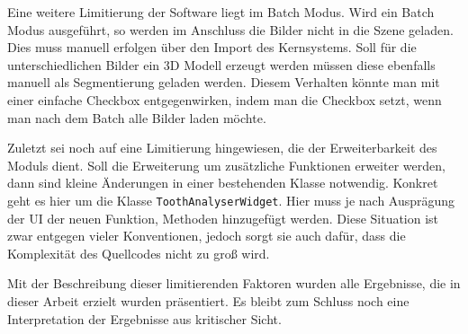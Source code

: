 Eine weitere Limitierung der Software liegt im Batch Modus. Wird ein Batch Modus
ausgeführt, so werden im Anschluss die Bilder nicht in die Szene geladen. Dies muss
manuell erfolgen über den Import des Kernsystems. Soll für die unterschiedlichen
Bilder ein \ac{3D} Modell erzeugt werden müssen diese ebenfalls manuell als Segmentierung
geladen werden. Diesem Verhalten könnte man mit einer einfache Checkbox
entgegenwirken, indem man die Checkbox setzt, wenn man nach dem Batch alle
Bilder laden möchte.

Zuletzt sei noch auf eine Limitierung hingewiesen, die der Erweiterbarkeit des Moduls
dient. Soll die Erweiterung um zusätzliche Funktionen erweiter werden, dann sind
kleine Änderungen in einer bestehenden Klasse notwendig. Konkret geht es hier um
die Klasse \texttt{ToothAnalyserWidget}. Hier muss je nach Ausprägung der \ac{UI}
der neuen Funktion, Methoden hinzugefügt werden. Diese Situation ist zwar entgegen
vieler Konventionen, jedoch sorgt sie auch dafür, dass die Komplexität des Quellcodes
nicht zu groß wird.

Mit der Beschreibung dieser limitierenden Faktoren wurden alle Ergebnisse, die
in dieser Arbeit erzielt wurden präsentiert. Es bleibt zum Schluss noch eine Interpretation
der Ergebnisse aus kritischer Sicht.
